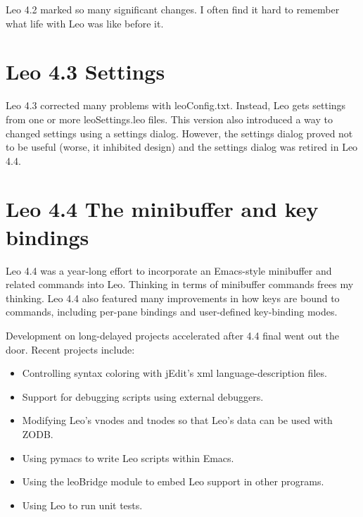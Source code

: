 \documentclass[a4paper,10pt,english]{sphinxmanual}
\begin{document}
Leo 4.2 marked so many significant changes. I often find it hard to remember
what life with Leo was like before it.


\section{Leo 4.3 Settings}
\label{history:leo-4-3-settings}
Leo 4.3 corrected many problems with leoConfig.txt. Instead, Leo gets
settings from one or more leoSettings.leo files. This version also
introduced a way to changed settings using a settings dialog.  However,
the settings dialog proved not to be useful (worse, it inhibited design) and
the settings dialog was retired in Leo 4.4.


\section{Leo 4.4 The minibuffer and key bindings}
\label{history:leo-4-4-the-minibuffer-and-key-bindings}
Leo 4.4 was a year-long effort to incorporate an Emacs-style minibuffer and
related commands into Leo. Thinking in terms of minibuffer commands frees my
thinking. Leo 4.4 also featured many improvements in how keys are bound to
commands, including per-pane bindings and user-defined key-binding modes.

Development on long-delayed projects accelerated after 4.4 final went out the door.
Recent projects include:
\begin{itemize}
\item {} 
Controlling syntax coloring with jEdit's xml language-description files.

\item {} 
Support for debugging scripts using external debuggers.

\item {} 
Modifying Leo's vnodes and tnodes so that Leo's data can be used with ZODB.

\item {} 
Using pymacs to write Leo scripts within Emacs.

\item {} 
Using the leoBridge module to embed Leo support in other programs.

\item {} 
Using Leo to run unit tests.

\end{itemize}
\end{document}
